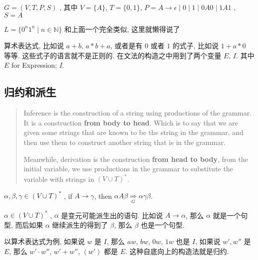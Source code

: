 \documentclass[../main_part1.tex]{subfiles}
\begin{document}
\begin{exam}[\(0,1\) 组成的回文]
	\(G = (V , T , P , S ) \) , 其中 \(V = \{ A \} \), \(T = \{ 0 , 1 \} \), \(P = A \to \epsilon \mid 0 \mid 1\mid  0A 0 \mid 1 A1\) , \(S = A\)
\end{exam}
\begin{exam}[\(0 ^{n}1 ^{n}\)]
	\(L = \{  0 ^{ n} 1 ^{n} \mid n \in \mathbb{N} \} \)
	和上面一个完全类似, 这里就懒得说了
\end{exam}
\begin{exam}
	算术表达式, 比如说 \( a + b \), \( a * b + a\), 或者是有 \(0\) 或者 \(1\) 的式子, 比如说 \( 1 + a * 0\) 等等. 这些式子的语言就不是正则的. 在文法的构造之中用到了两个变量 \(E\), \(I\). 其中 \(E\) for Expression; \(I\).
\end{exam}

\subsection{归约和派生}
\begin{quotation}
Inference is the construction of a string using productions of the grammar. It is a construction \textbf{from body to head}. Which is to say that we are given some strings that are known to be the string in the grammar, and then use them to construct 
another string that is in the grammar. 

	Meanwhile, derivation is the construction \textbf{from head to body}, from the initial variable, we use productions in the grammar to substitute the variable with strings in \( (V\cup T) ^{*}\). 
\end{quotation}
\begin{definition}[派生]
	\(\alpha ,\beta , \gamma \in (V \cup T ) ^{*}\) , if \(A \to \gamma\), then \( \alpha A\beta \underset{G}{\Rightarrow}\alpha \gamma\beta\). 
\end{definition}

\begin{definition}[文法派生的句型]
\(\alpha \in (V \cup T ) ^{*} \) , \(\alpha\) 是变元可能派生出的语句. 比如说 \(A \to\alpha\), 那么 \(\alpha\) 就是一个句型, 而后如果 \(\alpha\) 继续派生的得到了 \(\beta\), 那么 \(\beta\) 也是一个句型. 
\end{definition}

\begin{definition}[归约]
	以算术表达式为例, 如果说 \(w \) 是 \(I\), 那么 \(aw\), \(bw\), \(0w\), \(1w\) 也是 \(I\), 如果说 \(w' , w''\) 是 \(E\), 那么 \( w' \cdot w''\), \( w' + w''\), \( (w')\) 都是 \(E\). 这种自底向上的构造法就是归约. 
\end{definition}
\end{document}
